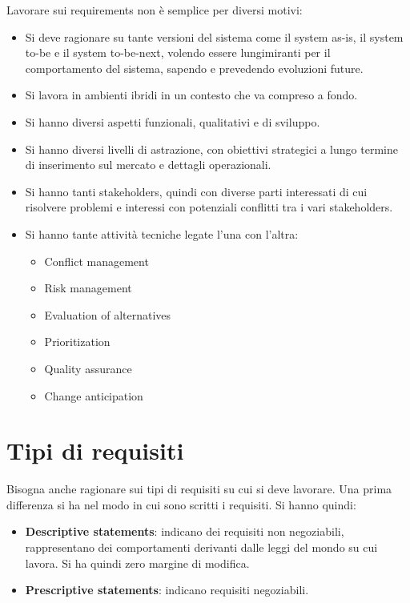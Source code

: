 Lavorare sui requirements non è semplice per diversi motivi:
\begin{itemize}
    \item Si deve ragionare su tante versioni del sistema come il system as-is,
          il system to-be e il system to-be-next, volendo essere lungimiranti per il
          comportamento del sistema, sapendo e prevedendo evoluzioni future.
    \item Si lavora in ambienti ibridi in un contesto che va compreso a fondo.
    \item Si hanno diversi aspetti funzionali, qualitativi e di sviluppo.
    \item Si hanno diversi livelli di astrazione, con obiettivi strategici a
          lungo termine di inserimento sul mercato e dettagli operazionali.
    \item Si hanno tanti stakeholders, quindi con diverse parti interessati di
          cui risolvere problemi e interessi con potenziali conflitti tra i vari
          stakeholders.
    \item Si hanno tante attività tecniche legate l'una con l'altra:
          \begin{itemize}
              \item Conflict management
              \item Risk management
              \item Evaluation of alternatives
              \item Prioritization
              \item Quality assurance
              \item Change anticipation
          \end{itemize}
\end{itemize}
\section{Tipi di requisiti}
Bisogna anche ragionare sui tipi di requisiti su cui si deve lavorare. Una prima
differenza si ha nel modo in cui sono scritti i requisiti. Si hanno quindi:
\begin{itemize}
    \item \textbf{Descriptive statements}: indicano dei requisiti non negoziabili,
          rappresentano dei comportamenti derivanti dalle leggi del mondo su cui
          lavora. Si ha quindi zero margine di modifica.
    \item \textbf{Prescriptive statements}: indicano requisiti negoziabili.
\end{itemize}

